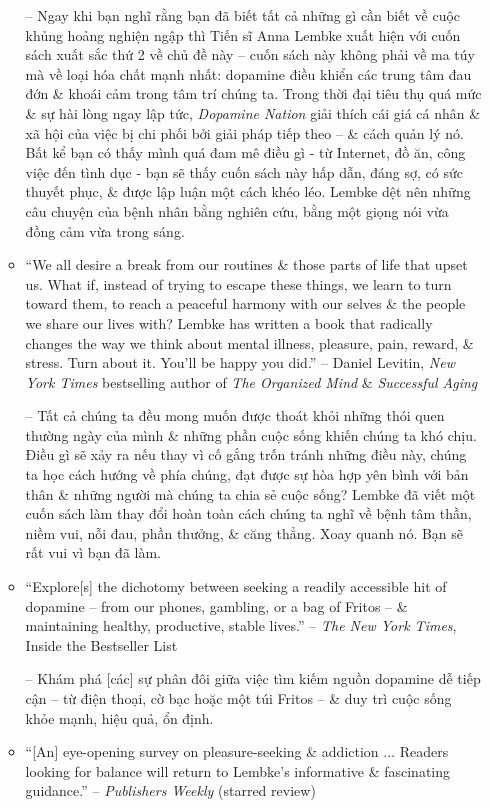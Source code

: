 \documentclass{article}
\begin{document}
\begin{enumerate}
\begin{itemize}
		-- Ngay khi bạn nghĩ rằng bạn đã biết tất cả những gì cần biết về cuộc khủng hoảng nghiện ngập thì Tiến sĩ {\sc Anna Lembke} xuất hiện với cuốn sách xuất sắc thứ 2 về chủ đề này -- cuốn sách này không phải về ma túy mà về loại hóa chất mạnh nhất: dopamine điều khiển các trung tâm đau đớn \& khoái cảm trong tâm trí chúng ta. Trong thời đại tiêu thụ quá mức \& sự hài lòng ngay lập tức, {\it Dopamine Nation} giải thích cái giá cá nhân \& xã hội của việc bị chi phối bởi giải pháp tiếp theo -- \& cách quản lý nó. Bất kể bạn có thấy mình quá đam mê điều gì - từ Internet, đồ ăn, công việc đến tình dục - bạn sẽ thấy cuốn sách này hấp dẫn, đáng sợ, có sức thuyết phục, \& được lập luận một cách khéo léo. Lembke dệt nên những câu chuyện của bệnh nhân bằng nghiên cứu, bằng một giọng nói vừa đồng cảm vừa trong sáng.
		\item ``We all desire a break from our routines \& those parts of life that upset us. What if, instead of trying to escape these things, we learn to turn toward them, to reach a peaceful harmony with our selves \& the people we share our lives with? Lembke has written a book that radically changes the way we think about mental illness, pleasure, pain, reward, \& stress. Turn about it. You'll be happy you did.'' -- {\sc Daniel Levitin}, {\it New York Times} bestselling author of {\it The Organized Mind} \& {\it Successful Aging}
		
		-- Tất cả chúng ta đều mong muốn được thoát khỏi những thói quen thường ngày của mình \& những phần cuộc sống khiến chúng ta khó chịu. Điều gì sẽ xảy ra nếu thay vì cố gắng trốn tránh những điều này, chúng ta học cách hướng về phía chúng, đạt được sự hòa hợp yên bình với bản thân \& những người mà chúng ta chia sẻ cuộc sống? Lembke đã viết một cuốn sách làm thay đổi hoàn toàn cách chúng ta nghĩ về bệnh tâm thần, niềm vui, nỗi đau, phần thưởng, \& căng thẳng. Xoay quanh nó. Bạn sẽ rất vui vì bạn đã làm.
		\item ``Explore[s] the dichotomy between seeking a readily accessible hit of dopamine -- from our phones, gambling, or a bag of Fritos -- \& maintaining healthy, productive, stable lives.'' -- {\it The New York Times}, Inside the Bestseller List
		
		-- Khám phá [các] sự phân đôi giữa việc tìm kiếm nguồn dopamine dễ tiếp cận -- từ điện thoại, cờ bạc hoặc một túi Fritos -- \& duy trì cuộc sống khỏe mạnh, hiệu quả, ổn định.		
		\item ``[An] eye-opening survey on pleasure-seeking \& addiction $\ldots$ Readers looking for balance will return to Lembke's informative \& fascinating guidance.'' -- {\it Publishers Weekly} (starred review)
		

\end{itemize}
\end{enumerate}
\end{document}
